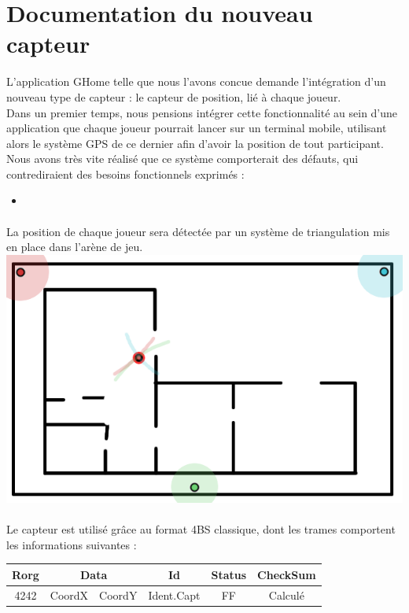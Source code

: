\section{Documentation du nouveau capteur}

L'application GHome telle que nous l'avons concue demande l'intégration d'un nouveau type de capteur : le capteur de position, lié à chaque joueur.\\

Dans un premier temps, nous pensions intégrer cette fonctionnalité au sein d'une application que chaque joueur pourrait lancer sur un terminal mobile, utilisant alors le système GPS de ce dernier afin d'avoir la position de tout participant.\\
Nous avons très vite réalisé que ce système comporterait des défauts, qui contrediraient des besoins fonctionnels exprimés : 
\begin{itemize}
 \item 
\end{itemize}

\paragraph{}
La position de chaque joueur sera détectée par un système de triangulation mis en place dans l'arène de jeu.\\
\includegraphics[scale=0.5]{image/triang}

\paragraph{}
Le capteur est utilisé grâce au format 4BS classique, dont les trames comportent les informations suivantes : 

\begin{center}
\begin{tabular}{|c|c|c|c|c|c|}
\hline
Rorg&\multicolumn{2}{|c|}{Data}&Id&Status&CheckSum\\
\hline
4242&CoordX&CoordY&Ident.Capt&FF&Calculé\\
\hline
\end{tabular}
\end{center}
 
